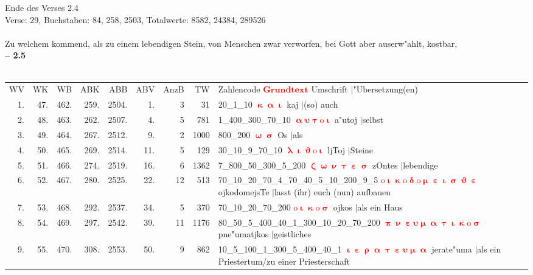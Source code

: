 \documentclass[a4paper,10pt,landscape]{article}
\begin{document}
Ende des Verses 2.4\\
Verse: 29, Buchstaben: 84, 258, 2503, Totalwerte: 8582, 24384, 289526\\
\\
Zu welchem kommend, als zu einem lebendigen Stein, von Menschen zwar verworfen, bei Gott aber auserw"ahlt, kostbar,\\
\newpage 
{\bf -- 2.5}\\
\medskip \\
\begin{tabular}{rrrrrrrrp{120mm}}
WV&WK&WB&ABK&ABB&ABV&AnzB&TW&Zahlencode \textcolor{red}{$\boldsymbol{Grundtext}$} Umschrift $|$"Ubersetzung(en)\\
1.&47.&462.&259.&2504.&1.&3&31&20\_1\_10 \textcolor{red}{$\boldsymbol{\upkappa\upalpha\upiota}$} kaj $|$(so) auch\\
2.&48.&463.&262.&2507.&4.&5&781&1\_400\_300\_70\_10 \textcolor{red}{$\boldsymbol{\upalpha\upsilon\uptau\mathrm{o}\upiota}$} a"utoj $|$selbst\\
3.&49.&464.&267.&2512.&9.&2&1000&800\_200 \textcolor{red}{$\boldsymbol{\upomega\upsigma}$} Os $|$als\\
4.&50.&465.&269.&2514.&11.&5&129&30\_10\_9\_70\_10 \textcolor{red}{$\boldsymbol{\uplambda\upiota\upvartheta\mathrm{o}\upiota}$} ljToj $|$Steine\\
5.&51.&466.&274.&2519.&16.&6&1362&7\_800\_50\_300\_5\_200 \textcolor{red}{$\boldsymbol{\upzeta\upomega\upnu\uptau\upepsilon\upsigma}$} zOntes $|$lebendige\\
6.&52.&467.&280.&2525.&22.&12&513&70\_10\_20\_70\_4\_70\_40\_5\_10\_200\_9\_5 \textcolor{red}{$\boldsymbol{\mathrm{o}\upiota\upkappa\mathrm{o}\updelta\mathrm{o}\upmu\upepsilon\upiota\upsigma\upvartheta\upepsilon}$} ojkodomejsTe $|$lasst (ihr) euch (nun) aufbauen\\
7.&53.&468.&292.&2537.&34.&5&370&70\_10\_20\_70\_200 \textcolor{red}{$\boldsymbol{\mathrm{o}\upiota\upkappa\mathrm{o}\upsigma}$} ojkos $|$als ein Haus\\
8.&54.&469.&297.&2542.&39.&11&1176&80\_50\_5\_400\_40\_1\_300\_10\_20\_70\_200 \textcolor{red}{$\boldsymbol{\uppi\upnu\upepsilon\upsilon\upmu\upalpha\uptau\upiota\upkappa\mathrm{o}\upsigma}$} pne"umatjkos $|$geistliches\\
9.&55.&470.&308.&2553.&50.&9&862&10\_5\_100\_1\_300\_5\_400\_40\_1 \textcolor{red}{$\boldsymbol{\upiota\upepsilon\uprho\upalpha\uptau\upepsilon\upsilon\upmu\upalpha}$} jerate"uma $|$als ein Priestertum/zu einer Priesterschaft\\

\end{tabular}
\end{document}
